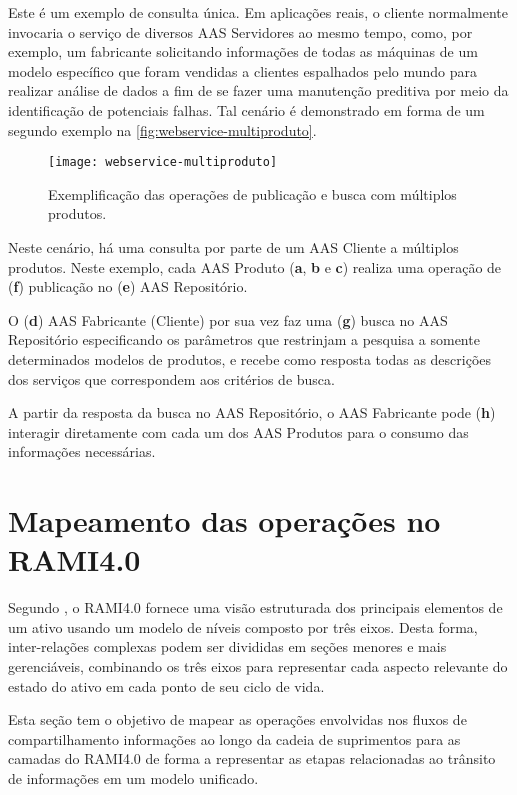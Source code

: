 Este é um exemplo de consulta única. Em aplicações reais, o cliente normalmente invocaria o serviço de diversos AAS Servidores ao mesmo tempo, como, por exemplo, um fabricante solicitando informações de todas as máquinas de um modelo específico que foram vendidas a clientes espalhados pelo mundo para realizar análise de dados a fim de se fazer uma manutenção preditiva por meio da identificação de potenciais falhas. Tal cenário é demonstrado em forma de um segundo exemplo na \autoref{fig:webservice-multiproduto}.

\begin{figure}[htb]
	\centering
	\texttt{[image: webservice-multiproduto]}
	\caption{Exemplificação das operações de publicação e busca com múltiplos produtos.}
	\label{fig:webservice-multiproduto}
\end{figure}

Neste cenário, há uma consulta por parte de um AAS Cliente a múltiplos produtos. Neste exemplo, cada AAS Produto (\textbf{a}, \textbf{b} e \textbf{c}) realiza uma operação de (\textbf{f}) publicação no (\textbf{e}) AAS Repositório.

O (\textbf{d}) AAS Fabricante (Cliente) por sua vez faz uma (\textbf{g}) busca no AAS Repositório especificando os parâmetros que restrinjam a pesquisa a somente determinados modelos de produtos, e recebe como resposta todas as descrições dos serviços que correspondem aos critérios de busca.

A partir da resposta da busca no AAS Repositório, o AAS Fabricante pode (\textbf{h}) interagir diretamente com cada um dos AAS Produtos para o consumo das informações necessárias.

\section{Mapeamento das operações no RAMI4.0}

Segundo , o RAMI4.0 fornece uma visão estruturada dos principais elementos de um ativo usando um modelo de níveis composto por três eixos. Desta forma, inter-relações complexas podem ser divididas em seções menores e mais gerenciáveis, combinando os três eixos para representar cada aspecto relevante do estado do ativo em cada ponto de seu ciclo de vida.

Esta seção tem o objetivo de mapear as operações envolvidas nos fluxos de compartilhamento informações ao longo da cadeia de suprimentos para as camadas do RAMI4.0 de forma a representar as etapas relacionadas ao trânsito de informações em um modelo unificado.

